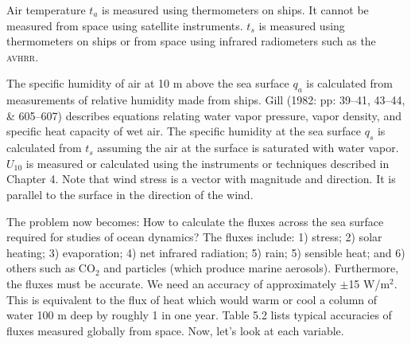 Air temperature $t_a$ is measured using thermometers on ships. It cannot
be measured from space using satellite instruments. $t_s$ is measured using
thermometers on ships or from space using infrared radiometers such as the
\textsc{avhrr}.

The specific humidity of air at 10 m above the sea surface
$q_a$ is calculated from measurements of relative humidity made from ships. Gill
(1982: pp: 39--41, 43--44, \& 605--607) describes equations relating water vapor
pressure, vapor density, and specific heat capacity of wet air. The specific
humidity at the sea surface $q_s$ is calculated from $t_s$ assuming the air at
the surface is saturated with water vapor. $U_{10}$ is measured or calculated
using the instruments or techniques described in Chapter 4. Note that wind
stress is a vector with magnitude and direction. It is parallel
to the surface in the direction of the wind.

The problem now becomes: How to calculate the fluxes across the sea surface
required for studies of ocean dynamics? The fluxes include: 1) stress; 2)
solar heating; 3) evaporation; 4) net infrared radiation; 5) rain; 5) sensible
heat; and 6) others such as CO$_2$ and particles (which produce marine
aerosols). Furthermore, the fluxes must be accurate. We need an accuracy of approximately $\pm$15 W/m$^2$. This is equivalent to the flux of heat which would
warm or cool a column of water 100 m deep by roughly 1 in one year. Table 5.2 lists
typical accuracies of fluxes measured globally from space. Now, let's look at each variable.

